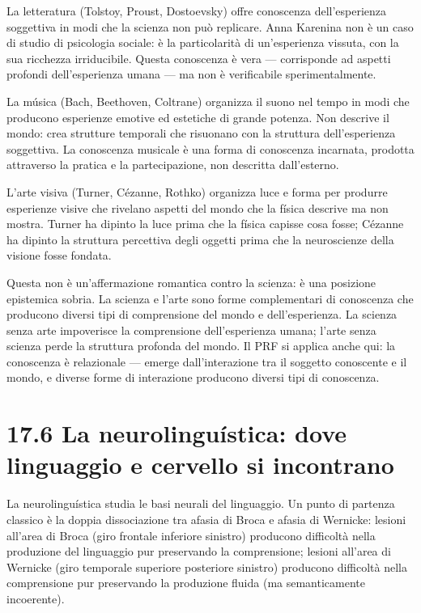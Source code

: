 \documentclass[11.5pt,a4paper,openany]{book}
\theoremstyle{remark}
\begin{document}
La letteratura (Tolstoy, Proust, Dostoevsky) offre conoscenza dell'esperienza soggettiva in modi che la scienza non può replicare. Anna Karenina non è un caso di studio di psicologia sociale: è la particolarità di un'esperienza vissuta, con la sua ricchezza irriducibile. Questa conoscenza è vera --- corrisponde ad aspetti profondi dell'esperienza umana --- ma non è verificabile sperimentalmente.

La música (Bach, Beethoven, Coltrane) organizza il suono nel tempo in modi che producono esperienze emotive ed estetiche di grande potenza. Non descrive il mondo: crea strutture temporali che risuonano con la struttura dell'esperienza soggettiva. La conoscenza musicale è una forma di conoscenza incarnata, prodotta attraverso la pratica e la partecipazione, non descritta dall'esterno.

L'arte visiva (Turner, Cézanne, Rothko) organizza luce e forma per produrre esperienze visive che rivelano aspetti del mondo che la física descrive ma non mostra. Turner ha dipinto la luce prima che la física capisse cosa fosse; Cézanne ha dipinto la struttura percettiva degli oggetti prima che la neuroscienze della visione fosse fondata.

Questa non è un'affermazione romantica contro la scienza: è una posizione epistemica sobria. La scienza e l'arte sono forme complementari di conoscenza che producono diversi tipi di comprensione del mondo e dell'esperienza. La scienza senza arte impoverisce la comprensione dell'esperienza umana; l'arte senza scienza perde la struttura profonda del mondo. Il PRF si applica anche qui: la conoscenza è relazionale --- emerge dall'interazione tra il soggetto conoscente e il mondo, e diverse forme di interazione producono diversi tipi di conoscenza.

\section{17.6 La neurolinguística: dove linguaggio e cervello si incontrano}

La neurolinguística studia le basi neurali del linguaggio. Un punto di partenza classico è la doppia dissociazione tra afasia di Broca e afasia di Wernicke: lesioni all'area di Broca (giro frontale inferiore sinistro) producono difficoltà nella produzione del linguaggio pur preservando la comprensione; lesioni all'area di Wernicke (giro temporale superiore posteriore sinistro) producono difficoltà nella comprensione pur preservando la produzione fluida (ma semanticamente incoerente).
\end{document}
